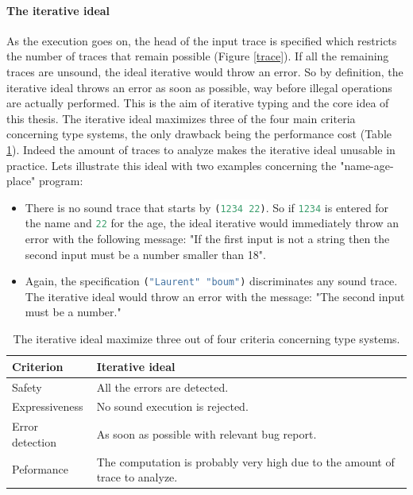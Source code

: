 \documentclass[a4paper]{report}
\newcommand{\ischeme}[1]{\colorbox{white}{\lstinline[language=scheme]&#1&}} %
\newcommand{\reftab}[1]{(Table \ref{#1})}
\newcommand{\reffig}[1]{(Figure \ref{#1})}
\begin{document}
\paragraph{The iterative ideal} As the execution goes on, the head of the input trace is specified which restricts the number of traces that remain possible \reffig{trace}. If all the remaining traces are unsound, the ideal iterative would throw an error. So by definition, the iterative ideal throws an error as soon as possible, way before illegal operations are actually performed. This is the aim of iterative typing and the core idea of this thesis. The iterative ideal maximizes three of the four main criteria concerning type systems, the only drawback being the performance cost \reftab{ideal_iter_crit}. Indeed the amount of traces to analyze makes the iterative ideal unusable in practice. Lets illustrate this ideal with two examples concerning the "name-age-place" program:
\begin{itemize}
\item There is no sound trace that starts by \ischeme{(1234 22)}. So if \ischeme{1234} is entered for the name and \ischeme{22} for the age, the ideal iterative would immediately throw an error with the following message: "If the first input is not a string then the second input must be a number smaller than 18".
\item Again, the specification \ischeme{("Laurent" "boum")} discriminates any sound trace. The iterative ideal would throw an error with the message: "The second input must be a number."
\end{itemize}

\begin{table}
\centering
\begin{tabular}{|p{5cm}|p{5cm}|}
\hline
Criterion & Iterative ideal\\
\hline
\hline
Safety & All the errors are detected.\\
\hline
Expressiveness & No sound execution is rejected.\\
\hline
Error detection & As soon as possible with relevant bug report.\\
\hline
Peformance & The computation is probably very high due to the amount of trace to analyze.\\
\hline
\end{tabular}
\caption{The iterative ideal maximize three out of four criteria concerning type systems.}
\label{ideal_iter_crit}
\end{table}
\end{document}
